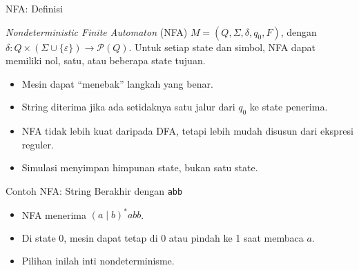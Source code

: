\documentclass[aspectratio=169,10pt,t]{beamer}
\begin{document}
\begin{frame}{NFA: Definisi}
  \begin{block}{\textit{Nondeterministic Finite Automaton} (NFA)}
    \small
    \(M = (Q, \Sigma, \delta, q_0, F)\), dengan
    \(\delta : Q \times (\Sigma \cup \{\varepsilon\}) \to
    \mathcal{P}(Q)\). Untuk setiap state dan simbol, NFA dapat memiliki
    nol, satu, atau beberapa state tujuan.
  \end{block}

  \begin{itemize}
    \item Mesin dapat ``menebak'' langkah yang benar.
    \item String diterima jika ada setidaknya satu jalur dari \(q_0\)
          ke state penerima.
    \item NFA tidak lebih kuat daripada DFA, tetapi lebih mudah
          disusun dari ekspresi reguler.
    \item Simulasi menyimpan himpunan state, bukan satu state.
  \end{itemize}
\end{frame}

\begin{frame}{Contoh NFA: String Berakhir dengan \texttt{abb}}
  \begin{center}
  \end{center}

  \vspace{2pt}
  \begin{itemize}
    \item NFA menerima \((a \mid b)^{*}abb\).
    \item Di state 0, mesin dapat tetap di 0 atau pindah ke 1 saat
          membaca \(a\).
    \item Pilihan inilah inti nondeterminisme.
  \end{itemize}
\end{frame}
\end{document}
